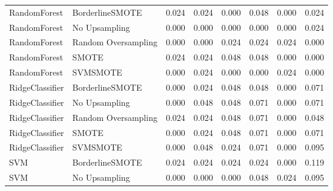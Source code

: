 \begin{tabular}{llllllll}
                RandomForest &     BorderlineSMOTE & 0.024 &                     0.024 &                 0.000 &                  0.048 &                                   0.000 &     0.024 \\
                RandomForest &       No Upsampling & 0.000 &                     0.000 &                 0.000 &                  0.000 &                                   0.000 &     0.024 \\
                RandomForest & Random Oversampling & 0.000 &                     0.000 &                 0.024 &                  0.024 &                                   0.024 &     0.000 \\
                RandomForest &               SMOTE & 0.024 &                     0.024 &                 0.048 &                  0.048 &                                   0.000 &     0.000 \\
                RandomForest &            SVMSMOTE & 0.000 &                     0.024 &                 0.000 &                  0.000 &                                   0.024 &     0.000 \\
             RidgeClassifier &     BorderlineSMOTE & 0.000 &                     0.024 &                 0.048 &                  0.048 &                                   0.000 &     0.071 \\
             RidgeClassifier &       No Upsampling & 0.000 &                     0.048 &                 0.048 &                  0.071 &                                   0.000 &     0.071 \\
             RidgeClassifier & Random Oversampling & 0.024 &                     0.024 &                 0.048 &                  0.071 &                                   0.000 &     0.048 \\
             RidgeClassifier &               SMOTE & 0.000 &                     0.024 &                 0.048 &                  0.071 &                                   0.000 &     0.071 \\
             RidgeClassifier &            SVMSMOTE & 0.000 &                     0.048 &                 0.024 &                  0.071 &                                   0.000 &     0.095 \\
                         SVM &     BorderlineSMOTE & 0.024 &                     0.024 &                 0.024 &                  0.024 &                                   0.000 &     0.119 \\
                         SVM &       No Upsampling & 0.000 &                     0.000 &                 0.000 &                  0.048 &                                   0.024 &     0.095 \\

\end{tabular}
